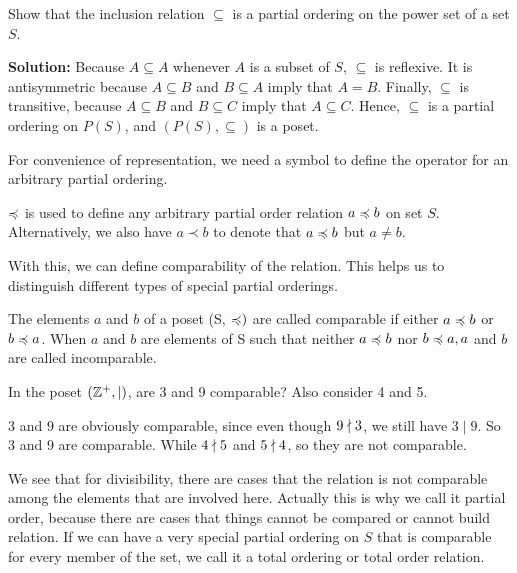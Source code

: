 \begin{example}
    Show that the inclusion relation $\subseteq$ is a partial ordering on the power set of a set $S$.
\end{example}
        
\textbf{Solution:} Because $A \subseteq A$ whenever $A$ is a subset of $S$, $\subseteq$ is reflexive. It is antisymmetric because $A \subseteq B$ and $B \subseteq A$ imply 
that $A = B$. Finally, $\subseteq$ is transitive, because $A \subseteq B$ and $B \subseteq C$ imply that $A \subseteq C$. Hence, $\subseteq$ is a partial ordering on $P(S)$, 
and $(P(S), \subseteq)$ is a poset.

For convenience of representation, we need a symbol to define the operator for an arbitrary partial ordering.
\begin{notation}
    $\preccurlyeq$ is used to define any arbitrary partial order relation $a \preccurlyeq b$ on set $S$.
    Alternatively, we also have $a \prec b$ to denote that $a\preccurlyeq b$ but $a \neq b$.
\end{notation}

With this, we can define comparability of the relation. This helps us to distinguish different types of special partial orderings.
\begin{definition}[Comparability]
    The elements $a$ and $b$ of a poset (S, $\preccurlyeq)$ are called comparable if either $a\preccurlyeq b$ or $b\preccurlyeq a$. When $a$ and $b$ are elements of S 
    such that neither $a\preccurlyeq b$ nor $b\preccurlyeq a,a$ and $b$ are called incomparable.
\end{definition}

\begin{example}
	In the poset $(\mathbb{Z}^+ ,\mid)$, are 3 and 9 comparable? Also consider 4 and 5.
\end{example}
\begin{solution}
	3 and 9 are obviously comparable, since even though $9 \nmid 3 $, we still have $3 \mid 9$. So 3 and 9 are comparable. While $4\nmid 5$ and $5\nmid 4$, so they are not comparable.
\end{solution}

We see that for divisibility, there are cases that the relation is not comparable among the elements that are involved here. Actually this is why we call it partial order, because there are cases that things cannot be compared or cannot build relation. If we can have a very special partial ordering on $S$ that is comparable for every member of the set, we call it a total ordering or total order relation.

